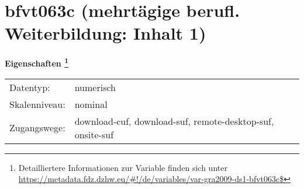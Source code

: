 
    \setcounter{footnote}{0}

    \vspace*{-1.8cm}
	\section{bfvt063c (mehrtägige berufl. Weiterbildung: Inhalt 1)}
	\label{section:bfvt063c}



    \vspace*{0.5cm}
    \noindent\textbf{Eigenschaften
	\footnote{Detailliertere Informationen zur Variable finden sich unter
		\url{https://metadata.fdz.dzhw.eu/\#!/de/variables/var-gra2009-ds1-bfvt063c$}}}\\
	\begin{tabularx}{\hsize}{@{}lX}
	Datentyp: & numerisch \\
	Skalenniveau: & nominal \\
	Zugangswege: &
	  download-cuf, 
	  download-suf, 
	  remote-desktop-suf, 
	  onsite-suf
 \\
    \end{tabularx}



